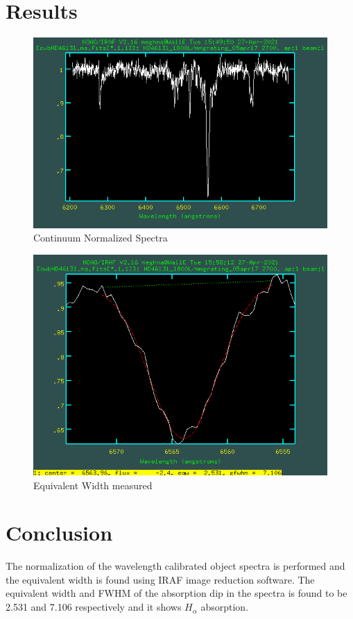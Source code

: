 \documentclass[letterpaper,11pt]{report}
\begin{document}
\section{Results}

\begin{figure}[H]
    \centering
    \includegraphics[scale=0.4]{iraf/normalized.png}
    \caption{Continuum Normalized Spectra}
    \label{fig:my_label}
\end{figure}

\begin{figure}[H]
    \centering
    \includegraphics[scale=0.4]{iraf/equivalent width.png}
    \caption{Equivalent Width measured}
    \label{fig:my_label}
\end{figure}

\section{Conclusion}
The normalization of the wavelength calibrated object spectra is performed and the equivalent width is found
using IRAF image reduction software. The equivalent width and FWHM of the absorption dip in the spectra
is found to be 2.531 and 7.106 respectively and it shows $ H_\alpha $  absorption.
\end{document}
